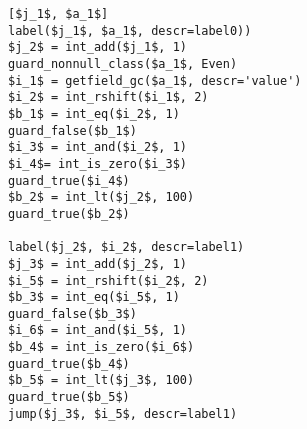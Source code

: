 \begin{lstlisting}[mathescape]
[$j_1$, $a_1$]
label($j_1$, $a_1$, descr=label0))
$j_2$ = int_add($j_1$, 1)
guard_nonnull_class($a_1$, Even)
$i_1$ = getfield_gc($a_1$, descr='value')
$i_2$ = int_rshift($i_1$, 2)
$b_1$ = int_eq($i_2$, 1)
guard_false($b_1$)
$i_3$ = int_and($i_2$, 1)
$i_4$= int_is_zero($i_3$)
guard_true($i_4$)
$b_2$ = int_lt($j_2$, 100)
guard_true($b_2$)

label($j_2$, $i_2$, descr=label1)
$j_3$ = int_add($j_2$, 1)
$i_5$ = int_rshift($i_2$, 2)
$b_3$ = int_eq($i_5$, 1)
guard_false($b_3$)
$i_6$ = int_and($i_5$, 1)
$b_4$ = int_is_zero($i_6$)
guard_true($b_4$)
$b_5$ = int_lt($j_3$, 100)
guard_true($b_5$)
jump($j_3$, $i_5$, descr=label1)
\end{lstlisting}
